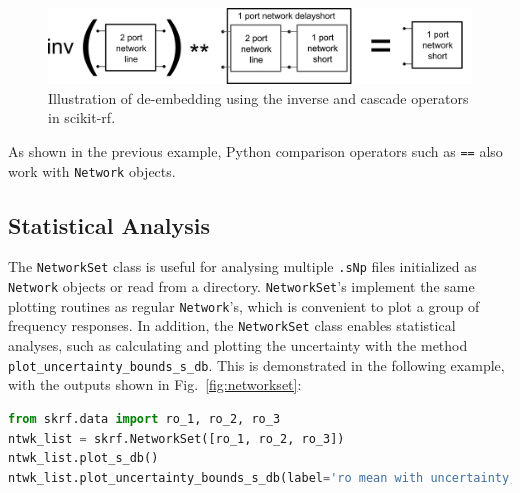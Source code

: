 \documentclass[10pt, letterpaper]{scrartcl}
\newcommand{\skrf}{{s}cikit-rf\xspace}
\begin{document}
\begin{figure}
	\centering
	\includegraphics[width=0.9\linewidth]{figures/deembedding.png}
	\caption{Illustration of de-embedding using the inverse and cascade operators in \skrf{}.}
	\label{fig:deembedding}
\end{figure}

As shown in the previous example, Python comparison operators such as \texttt{==} also work with \texttt{Network} objects. 

\subsection{Statistical Analysis}
The \texttt{NetworkSet} class is useful for analysing multiple \texttt{.sNp} files initialized as \texttt{Network} objects or read from a directory. \texttt{NetworkSet}'s implement the same plotting routines as regular \texttt{Network}'s, which is convenient to plot a group of frequency responses. In addition, the \texttt{NetworkSet} class enables statistical analyses, such as calculating and plotting the uncertainty with the method \texttt{plot\_uncertainty\_bounds\_s\_db}. This is demonstrated in the following example, with the outputs shown in Fig.~\ref{fig:networkset}:

\begin{lstlisting}[language=Python]
from skrf.data import ro_1, ro_2, ro_3
ntwk_list = skrf.NetworkSet([ro_1, ro_2, ro_3])
ntwk_list.plot_s_db()
ntwk_list.plot_uncertainty_bounds_s_db(label='ro mean with uncertainty, S11')
\end{lstlisting}
\end{document}
